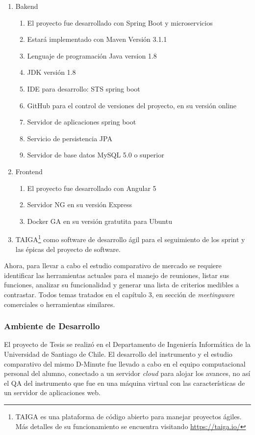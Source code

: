 \begin{enumerate}[A]
    \item Bakend
    \begin{enumerate}[a]
		\item El proyecto fue desarrollado con Spring Boot y microservicios
		\item Estará implementado con Maven Versión 3.1.1
		\item Lenguaje de programación Java version 1.8
		\item JDK versión 1.8
		\item IDE para desarrollo: STS spring boot
		\item GitHub para el control de versiones del proyecto, en su versión online
		\item Servidor de aplicaciones spring boot
		\item Servicio de persistencia JPA
		\item Servidor de base datos MySQL 5.0 o superior
    \end{enumerate}
    \item Frontend
    \begin{enumerate}[a]
		\item El proyecto fue desarrollado con Angular 5
		\item Servidor NG en su versión Express
		\item Docker GA en su versión gratutita para Ubuntu
    \end{enumerate}    
    \item TAIGA\footnote{TAIGA es una plataforma de código abierto para manejar proyectos ágiles. Más detalles de su funcionamiento se encuentra visitando \url{https://taiga.io/}} como software de desarrollo ágil para el seguimiento de los sprint y las épicas del proyecto de software.
\end{enumerate}

Ahora, para llevar a cabo el estudio comparativo de mercado se requiere identificar las herramientas actuales para el manejo de reuniones, listar sus funciones, analizar su funcionalidad y generar una lista de criterios medibles a contrastar. Todos temas tratados en el capítulo 3, en sección de \textit{meetingware} comerciales o herramientas similares.

\subsubsection{Ambiente de Desarrollo}

El proyecto de Tesis se realizó en el Departamento de Ingeniería Informática de la Universidad de Santiago de Chile. El desarrollo del instrumento y el estudio comparativo del mismo D-Minute fue llevado a cabo en el equipo computacional personal del alumno, conectado a un servidor \textsl{cloud} para alojar los avances, no así el QA del instrumento que fue en una máquina virtual con las características de un servidor de aplicaciones web.

